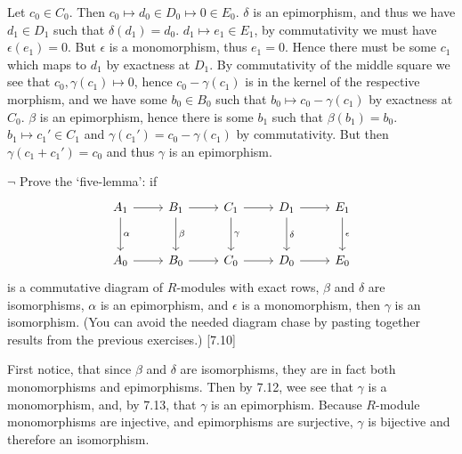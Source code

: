 \begin{solution}
	Let $c_0 \in C_0$. Then $c_0 \mapsto d_0 \in D_0 \mapsto 0 \in E_0$. $\delta$ is an epimorphism, and thus we have $d_1 \in D_1$ such that $\delta(d_1) = d_0$. $d_1 \mapsto e_1 \in E_1$, by commutativity we must have $\epsilon(e_1) = 0$. But $\epsilon$ is a monomorphism, thus $e_1 = 0$. Hence there must be some $c_1$ which maps to $d_1$ by exactness at $D_1$. By commutativity of the middle square we see that $c_0, \gamma(c_1) \mapsto 0$, hence $c_0 - \gamma(c_1)$ is in the kernel of the respective morphism, and we have some $b_0 \in B_0$ such that $b_0 \mapsto c_0 - \gamma(c_1)$ by exactness at $C_0$. $\beta$ is an epimorphism, hence there is some $b_1$ such that $\beta(b_1) = b_0$. $b_1 \mapsto c_1' \in C_1$ and $\gamma(c_1') = c_0 - \gamma(c_1)$ by commutativity. But then $\gamma(c_1 + c_1') = c_0$ and thus $\gamma$ is an epimorphism.
\end{solution}

\begin{problem}
	$\neg$ Prove the `five-lemma': if
	\[
		\begin{tikzcd}[row sep=large]
			A_1
			\arrow[r]
			\arrow[d, "\alpha"]
			& B_1
			\arrow[r]
			\arrow[d, "\beta"]
			& C_1
			\arrow[r]
			\arrow[d, "\gamma"]
			& D_1
			\arrow[r]
			\arrow[d, "\delta"]
			& E_1
			\arrow[d, "\epsilon"] \\
			A_0
			\arrow[r]
			& B_0
			\arrow[r]
			& C_0
			\arrow[r]
			& D_0
			\arrow[r]
			& E_0
		\end{tikzcd}
	\]
	is a commutative diagram of $R$-modules with exact rows, $\beta$ and $\delta$ are isomorphisms, $\alpha$ is an epimorphism, and $\epsilon$ is a monomorphism, then $\gamma$ is an isomorphism. (You can avoid the needed diagram chase by pasting together results from the previous exercises.) [7.10]
\end{problem}

\begin{solution}
	First notice, that since $\beta$ and $\delta$ are isomorphisms, they are in fact both monomorphisms and epimorphisms. Then by 7.12, wee see that $\gamma$ is a monomorphism, and, by 7.13, that $\gamma$ is an epimorphism. Because $R$-module monomorphisms are injective, and epimorphisms are surjective, $\gamma$ is bijective and therefore an isomorphism.
\end{solution}

